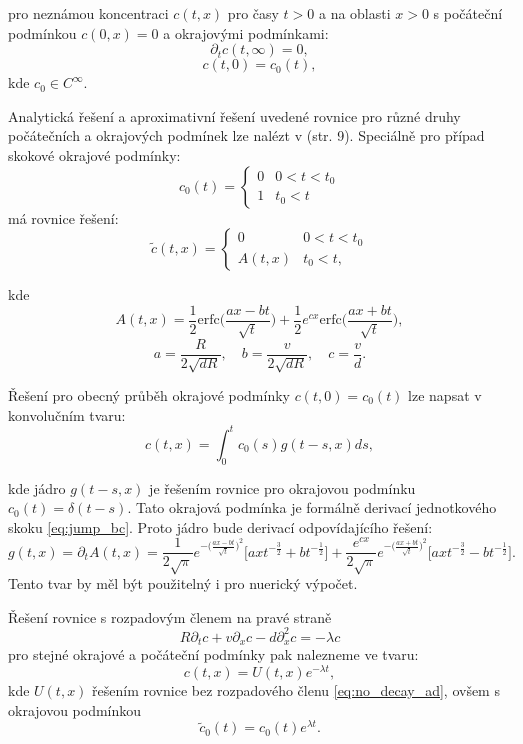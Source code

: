 \documentclass{article}
\def\prtl{\partial}
\begin{document}
pro neznámou koncentraci $c(t, x)$ pro časy $t>0$ a na oblasti $x>0$ s počáteční podmínkou $c(0, x) = 0$ a
okrajovými podmínkami:
\[
    \prtl_t c(t, \infty) = 0,
\]
\[
    c(t, 0) = c_0(t),
\]
kde $c_0 \in C^\infty$.

Analytická řešení a aproximativní řešení uvedené rovnice pro různé druhy počátečních
a okrajových podmínek lze nalézt v \cite{Genuchten1982} (str. 9). 
Speciálně pro případ skokové okrajové podmínky:
\begin{equation}
    \label{eq:jump_bc}
    c_0(t) = \left\{\begin{array}{ll}
         0 & 0 < t < t_0 \\
         1   & t_0 < t
    \end{array}\right. 
\end{equation}
má rovnice řešení:
\begin{equation}
    \label{eq:jump_sol}
    \tilde c(t, x) = 
    \left\{\begin{array}{ll}
         0                     & 0 < t < t_0 \\
         A(t,x)   & t_0 < t,
    \end{array}\right. 
\end{equation}

kde
\[
    A(t,x) = \frac12 \mathrm{erfc}\Big(\frac{ax-bt}{\sqrt t}\Big)
    + \frac12 e^{cx}\mathrm{erfc}\Big(\frac{ax+bt}{\sqrt t}\Big),
\]
\[
    a = \frac{R}{2\sqrt{dR}},\quad 
    b=\frac{v}{2\sqrt{dR}},\quad 
    c=\frac{v}{d}.
\]

Řešení pro obecný průběh okrajové podmínky $c(t,0) = c_0(t)$ lze napsat v konvolučním tvaru:
\[
    c(t,x) = \int_0^t c_0(s) g(t - s, x) ds,
\]

kde jádro $g(t - s, x)$ je řešením rovnice pro okrajovou podmínku $c_0(t) = \delta(t - s)$. 
Tato okrajová podmínka je formálně derivací jednotkového skoku \eqref{eq:jump_bc}. 
Proto jádro bude derivací odpovídajícího řešení:
\[
    g(t, x) = \prtl_t A(t, x) = 
    \frac{1}{2\sqrt{\pi}} 
    e^{-\big( \frac{ax-bt}{\sqrt{t}}\big)^2}
    \Big[ ax t^{-\frac32} + b t^{-\frac12}\Big]
    + \frac{e^{cx}}{2\sqrt{\pi}}  
    e^{-\big( \frac{ax+bt}{\sqrt{t}}\big)^2}
    \Big[ ax t^{-\frac32} - b t^{-\frac12}\Big].
\]
Tento tvar by měl být použitelný i pro nuerický výpočet.


Řešení rovnice s rozpadovým členem na pravé straně
\[
 R\prtl_t c + v \prtl_x c - d \prtl^2_x c = - \lambda c
\]
pro stejné okrajové a počáteční podmínky pak nalezneme ve tvaru:
\[
    c(t,x) = U(t,x) e^{-\lambda t},
\]
kde $U(t,x)$ řešením rovnice bez rozpadového členu \eqref{eq:no_decay_ad}, ovšem s okrajovou podmínkou
\[
    \tilde{c}_0(t) = c_0(t) e^{\lambda t}.
\]
\end{document}
